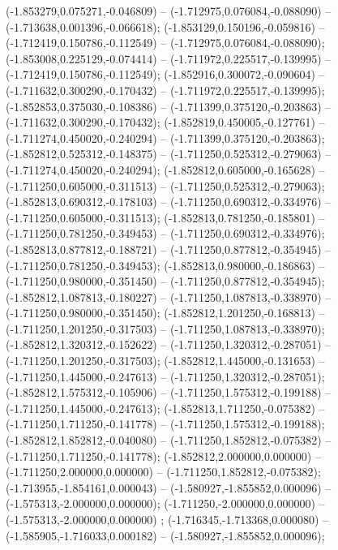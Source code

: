  (-1.853279,0.075271,-0.046809) -- (-1.712975,0.076084,-0.088090) -- (-1.713638,0.001396,-0.066618);
 (-1.853129,0.150196,-0.059816) -- (-1.712419,0.150786,-0.112549) -- (-1.712975,0.076084,-0.088090);
 (-1.853008,0.225129,-0.074414) -- (-1.711972,0.225517,-0.139995) -- (-1.712419,0.150786,-0.112549);
 (-1.852916,0.300072,-0.090604) -- (-1.711632,0.300290,-0.170432) -- (-1.711972,0.225517,-0.139995);
 (-1.852853,0.375030,-0.108386) -- (-1.711399,0.375120,-0.203863) -- (-1.711632,0.300290,-0.170432);
 (-1.852819,0.450005,-0.127761) -- (-1.711274,0.450020,-0.240294) -- (-1.711399,0.375120,-0.203863);
 (-1.852812,0.525312,-0.148375) -- (-1.711250,0.525312,-0.279063) -- (-1.711274,0.450020,-0.240294);
 (-1.852812,0.605000,-0.165628) -- (-1.711250,0.605000,-0.311513) -- (-1.711250,0.525312,-0.279063);
 (-1.852813,0.690312,-0.178103) -- (-1.711250,0.690312,-0.334976) -- (-1.711250,0.605000,-0.311513);
 (-1.852813,0.781250,-0.185801) -- (-1.711250,0.781250,-0.349453) -- (-1.711250,0.690312,-0.334976);
 (-1.852813,0.877812,-0.188721) -- (-1.711250,0.877812,-0.354945) -- (-1.711250,0.781250,-0.349453);
 (-1.852813,0.980000,-0.186863) -- (-1.711250,0.980000,-0.351450) -- (-1.711250,0.877812,-0.354945);
 (-1.852812,1.087813,-0.180227) -- (-1.711250,1.087813,-0.338970) -- (-1.711250,0.980000,-0.351450);
 (-1.852812,1.201250,-0.168813) -- (-1.711250,1.201250,-0.317503) -- (-1.711250,1.087813,-0.338970);
 (-1.852812,1.320312,-0.152622) -- (-1.711250,1.320312,-0.287051) -- (-1.711250,1.201250,-0.317503);
 (-1.852812,1.445000,-0.131653) -- (-1.711250,1.445000,-0.247613) -- (-1.711250,1.320312,-0.287051);
 (-1.852812,1.575312,-0.105906) -- (-1.711250,1.575312,-0.199188) -- (-1.711250,1.445000,-0.247613);
 (-1.852813,1.711250,-0.075382) -- (-1.711250,1.711250,-0.141778) -- (-1.711250,1.575312,-0.199188);
 (-1.852812,1.852812,-0.040080) -- (-1.711250,1.852812,-0.075382) -- (-1.711250,1.711250,-0.141778);
 (-1.852812,2.000000,0.000000) -- (-1.711250,2.000000,0.000000) -- (-1.711250,1.852812,-0.075382);
 (-1.713955,-1.854161,0.000043) -- (-1.580927,-1.855852,0.000096) -- (-1.575313,-2.000000,0.000000);
 (-1.711250,-2.000000,0.000000) -- (-1.575313,-2.000000,0.000000) ;
 (-1.716345,-1.713368,0.000080) -- (-1.585905,-1.716033,0.000182) -- (-1.580927,-1.855852,0.000096);
